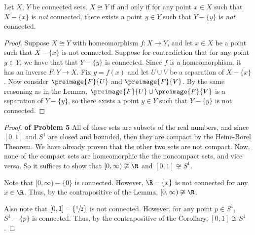 \documentclass[letterpaper]{article}
\begin{document}
\begin{enumerate}
\begin{corollary*}
Let $X$, $Y$ be connected sets. $X\cong Y$ if and only if for any point $x\in X$ such that $X-\{x\}$ is \emph{not} connected, there exists a point $y\in Y$ such that $Y-\{y\}$ is \emph{not} connected. 
\end{corollary*}
\begin{proof}
Suppose $X\cong Y$ with homeomorphism $f:X\to Y$, and let $x\in X$ be a point such that $X-\{x\}$ is not connected. Suppose for contradiction that for any point $y\in Y$, we have that that $Y-\{y\}$ is connected. Since $f$ is a homeomorphism, it has an inverse $F:Y\to X$. Fix $y=f(x)$ and let $U\cup V$ be a separation of $X-\{x\}$. Now consider $\preimage{F}{U}$ and $\preimage{F}{V}$. By the same reasoning as in the Lemma, $\preimage{F}{U} \cup \preimage{F}{V}$ is a separation of $Y-\{y\}$, so there exists a point $y\in Y$ such that $Y-\{y\}$ is not connected.
\end{proof}

\begin{proof}\textbf{of Problem 5}
All of these sets are subsets of the real numbers, and since $[0,1]$ and $S^1$ are closed and bounded, then they are compact by the Heine-Borel Theorem. We have already proven that the other two sets are not compact. Now, none of the compact sets are homeomorphic the the noncompact sets, and vice versa. So it suffices to show that $[0,\infty)\not\cong\R$ and $[0,1]\not\cong S^1$.  

Note that $[0,\infty)-\{0\}$ is connected. However, $\R-\{x\}$ is not connected for any $x\in\R$. Thus, by the contrapositive of the Lemma, $[0,\infty)\not\cong\R$.

Also note that $[0,1]-\{\sfrac{1}{2}\}$ is not connected. However, for any point $p\in S^1$, $S^1-\{p\}$ is connected. Thus, by the contrapositive of the Corollary, $[0,1]\not\cong S^1$. 
\end{proof}


\end{enumerate}
\end{document}
